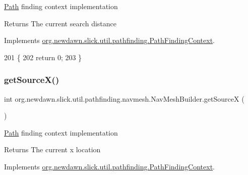 \mbox{\hyperlink{classorg_1_1newdawn_1_1slick_1_1util_1_1pathfinding_1_1_path}{Path}} finding context implementation

\begin{DoxyReturn}{Returns}
The current search distance 
\end{DoxyReturn}


Implements \mbox{\hyperlink{interfaceorg_1_1newdawn_1_1slick_1_1util_1_1pathfinding_1_1_path_finding_context_af6c873041cbca8ad6edfd63c6e10d243}{org.\+newdawn.\+slick.\+util.\+pathfinding.\+Path\+Finding\+Context}}.


\begin{DoxyCode}
201                                    \{
202         \textcolor{keywordflow}{return} 0;
203     \}
\end{DoxyCode}
\mbox{\label{classorg_1_1newdawn_1_1slick_1_1util_1_1pathfinding_1_1navmesh_1_1_nav_mesh_builder_a368af4ad284ad517158244a34f6111a5}} 
\subsubsection{\texorpdfstring{get\+Source\+X()}{getSourceX()}}
{\footnotesize\ttfamily int org.\+newdawn.\+slick.\+util.\+pathfinding.\+navmesh.\+Nav\+Mesh\+Builder.\+get\+SourceX (\begin{DoxyParamCaption}{ }\end{DoxyParamCaption})\hspace{0.3cm}{\ttfamily [inline]}}

\mbox{\hyperlink{classorg_1_1newdawn_1_1slick_1_1util_1_1pathfinding_1_1_path}{Path}} finding context implementation

\begin{DoxyReturn}{Returns}
The current x location 
\end{DoxyReturn}


Implements \mbox{\hyperlink{interfaceorg_1_1newdawn_1_1slick_1_1util_1_1pathfinding_1_1_path_finding_context_a7b67cdc7d0eaf54e6e07d09b1a575065}{org.\+newdawn.\+slick.\+util.\+pathfinding.\+Path\+Finding\+Context}}.


